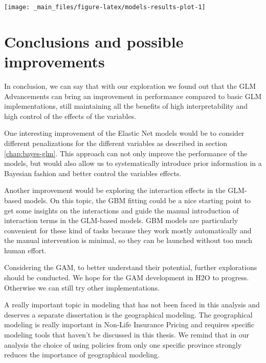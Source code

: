 \documentclass[a4paper, twoside, openright, 12pt]{report}
\let\origfigure\figure
\let\endorigfigure\endfigure
\renewenvironment{figure}[1][2] {
  \expandafter\origfigure\expandafter[!hbtp]
} {
  \endorigfigure
}
\theoremstyle{definition}
\theoremstyle{definition}
\theoremstyle{definition}
\theoremstyle{remark}
\begin{document}
\begin{figure}[!hbtp]

{\centering \texttt{[image: \_main\_files/figure-latex/models-results-plot-1]} 

}

\caption[Deviance computed in the test set for the models considered.]{Deviance computed in the test set for the models considered.}\label{fig:models-results-plot}
\end{figure}

\newpage

\hypertarget{chap:conclusions}{%
\section{Conclusions and possible improvements}\label{chap:conclusions}}

In conclusion, we can say that with our exploration we found out that the GLM Advancements can bring an improvement in performance compared to basic GLM implementations, still maintaining all the benefits of high interpretability and high control of the effects of the variables.

One interesting improvement of the Elastic Net models would be to consider different penalizations for the different variables as described in section \ref{chap:bayes-glm}. This approach can not only improve the performance of the models, but would also allow us to systematically introduce prior information in a Bayesian fashion and better control the variables effects.

Another improvement would be exploring the interaction effects in the GLM-based models. On this topic, the GBM fitting could be a nice starting point to get some insights on the interactions and guide the manual introduction of interaction terms in the GLM-based models. GBM models are particularly convenient for these kind of tasks because they work mostly automatically and the manual intervention is minimal, so they can be launched without too much human effort.

Considering the GAM, to better understand their potential, further explorations should be conducted. We hope for the GAM development in H2O to progress. Otherwise we can still try other implementations.

A really important topic in modeling that has not been faced in this analysis and deserves a separate dissertation is the geographical modeling. The geographical modeling is really important in Non-Life Insurance Pricing and requires specific modeling tools that haven't be discussed in this thesis. We remind that in our analysis the choice of using policies from only one specific province strongly reduces the importance of geographical modeling.
\end{document}
